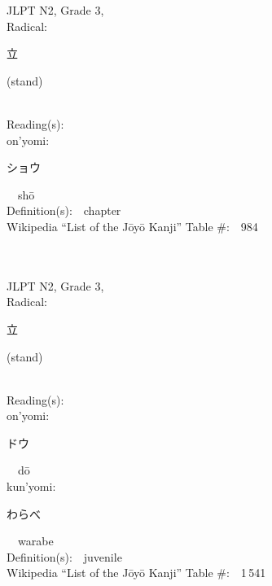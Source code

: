 \begin{multicols}{2}
{JLPT N2, Grade 3, \\Radical:\ \ {\begin{CJK}{UTF8}{min} 立 \end{CJK}} (stand) } \\
Reading(s):\ \ \\
{\hspace*{1em}}on'yomi:\ \ \\
{\hspace*{2em}}{\begin{CJK}{UTF8}{min} ショウ \end{CJK}}\ \ sh\=o\ \ \\
Definition(s):\ \ chapter \\
Wikipedia ``List of the J\=oy\=o Kanji'' Table \#:\ \ 984 \\
\ \ \\
{\fontsize{34pt}{40pt}  }\ \ \\  %
{JLPT N2, Grade 3, \\Radical:\ \ {\begin{CJK}{UTF8}{min} 立 \end{CJK}} (stand) } \\
Reading(s):\ \ \\
{\hspace*{1em}}on'yomi:\ \ \\
{\hspace*{2em}}{\begin{CJK}{UTF8}{min} ドウ \end{CJK}}\ \ d\=o\ \ \\
{\hspace*{1em}}kun'yomi:\ \ \\
{\hspace*{2em}}{\begin{CJK}{UTF8}{min} わらべ \end{CJK}}\ \ warabe\ \ \\
Definition(s):\ \ juvenile \\
Wikipedia ``List of the J\=oy\=o Kanji'' Table \#:\ \ 1\,541 \\
\ \ \\
{\fontsize{34pt}{40pt}  }\ \ \\  %

\end{multicols}
